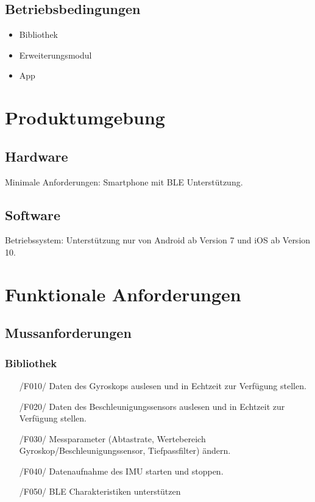 \documentclass[a4paper,12pt]{article}
\begin{document}
  \subsection{Betriebsbedingungen} %
    \begin{itemize}
      \item\textsf{Bibliothek} 
      \item\textsf{Erweiterungsmodul}
      \item\textsf{App}
    \end{itemize}

\section{Produktumgebung}
\subsection{Hardware} \textsf{Minimale Anforderungen:} Smartphone mit \Gls{BLE} Unterstützung.
\subsection{Software} \textsf{Betriebssystem:} Unterstützung nur von Android ab Version 7 und iOS ab Version 10.

\section{Funktionale Anforderungen}
  \subsection{Mussanforderungen}
    \subsubsection{Bibliothek}
    \begin{itemize}
      \item[/F010/] Daten des Gyroskops auslesen und in \Gls{Echtzeit} zur Verfügung stellen.
      \item[/F020/] Daten des Beschleunigungssensors auslesen und in Echtzeit zur Verfügung stellen.
      \item[/F030/] Messparameter (Abtastrate, Wertebereich Gyroskop/Beschleunigungssensor, Tiefpassfilter) ändern. %
      \item[/F040/] Datenaufnahme des IMU starten und stoppen.
      \item[/F050/] BLE Charakteristiken unterstützen %
    \end{itemize}
\end{document}
